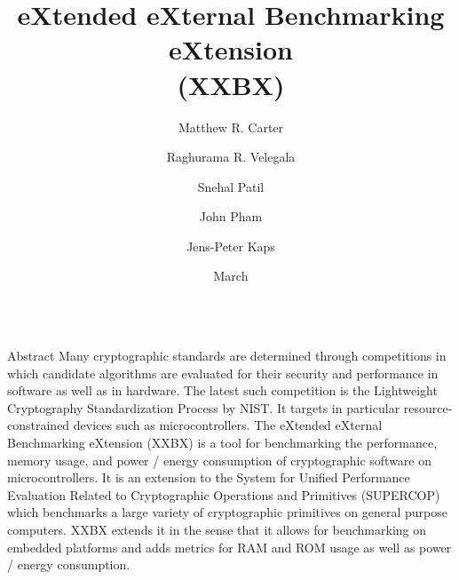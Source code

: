 \documentclass[xcolor=pdftex,dvipsnames,table,final]{beamer}
\title{\LARGE eXtended eXternal Benchmarking eXtension\\ \vspace{0.5ex}(XXBX)}
\author{Matthew R. Carter \and Raghurama R. Velegala \and Snehal Patil \and John Pham \and Jens-Peter Kaps}%
\institute{\vspace{-1ex}Department of Electrical and Computer Engineering, George Mason University, Fairfax, Virginia 22030, USA }
\date{March}
\begin{document}
\begin{frame}[fragile]{} 
  \begin{columns}[t, totalwidth=\textwidth]
    \begin{column}{.31\linewidth}

      \begin{block}{Abstract}
Many cryptographic standards are determined through competitions in which 
candidate algorithms are evaluated for their security and performance in software as
well as in hardware. 
The latest such competition is the Lightweight Cryptography Standardization
Process by NIST. 
It targets in particular resource-constrained devices such as 
microcontrollers.
%
The eXtended eXternal Benchmarking eXtension (XXBX) is a tool for benchmarking the performance, 
memory usage, and power / energy consumption of cryptographic software on microcontrollers. 
It is an extension to the System for Unified Performance Evaluation Related to Cryptographic 
Operations and Primitives (SUPERCOP) which benchmarks a large variety of cryptographic primitives 
on general purpose computers. XXBX extends it in the sense that it allows for benchmarking on 
embedded platforms and adds metrics for RAM and ROM usage as well as power / energy consumption. 
      \end{block}


\end{column}
\end{columns}
\end{frame}
\end{document}
